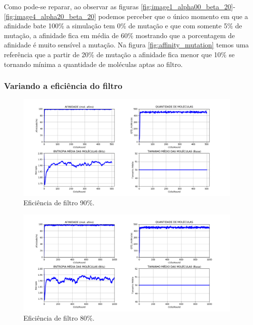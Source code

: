 \newpage
Como pode-se reparar, ao observar as figuras \ref{fig:image1_alpha00_beta_20}-\ref{fig:image4_alpha20_beta_20} podemos perceber que o único momento em que a afinidade bate 100\% a simulação tem 0\% de mutação e que com
somente 5\% de mutação, a afinidade fica em média de 60\% mostrando que a porcentagem
de afinidade é muito sensível a mutação. Na figura \ref{fig:affinity_mutation} temos uma referência que a partir
de 20\% de mutação a afinidade fica menor que 10\% se tornando mínima a quantidade de
moléculas aptas ao filtro.

\subsubsection{Variando a eficiência do filtro}

\begin{figure}[!h]
    \centering
    \includegraphics[width=15cm]{figures/image9_alpha05_beta_90.png}
    \caption{Eficiência de filtro 90\%.}
    \label{fig:image9_alpha05_beta_90}
\end{figure}

\begin{figure}[!h]
    \centering
    \includegraphics[width=15cm]{figures/image8_alpha05_beta_80.png}
    \caption{Eficiência de filtro 80\%.}
    \label{fig:image8_alpha05_beta_80}
\end{figure}

